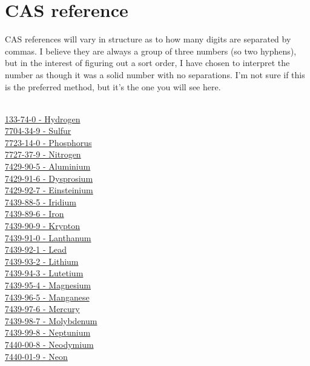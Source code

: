 \chapter{CAS reference}
CAS references will vary in structure as to how many digits are separated by commas.  I believe they are always a group of three numbers (so two hyphens), but in the interest of figuring out a sort order, I have chosen to interpret the number as though it was a solid number with no separations.  I'm not sure if this is the preferred method, but it's the one you will see here.\\
\\
\begin{multicols}{2}
\noindent
\hyperref[sec:elem-hydrogen]{133-74-0 - Hydrogen}\\
\hyperref[sec:elem-sulfur]{7704-34-9 - Sulfur}\\
\hyperref[sec:elem-phosphorus]{7723-14-0 - Phosphorus}\\
\hyperref[sec:elem-nitrogen]{7727-37-9 - Nitrogen}\\
\hyperref[sec:elem-aluminium]{7429-90-5 - Aluminium}\\
\hyperref[sec:elem-dysprosium]{7429-91-6 - Dysprosium}\\
\hyperref[sec:elem-einsteinium]{7429-92-7 - Einsteinium}\\
\hyperref[sec:elem-iridium]{7439-88-5 - Iridium}\\
\hyperref[sec:elem-iron]{7439-89-6 - Iron}\\
\hyperref[sec:elem-krypton]{7439-90-9 - Krypton}\\
\hyperref[sec:elem-lanthanum]{7439-91-0 - Lanthanum}\\
\hyperref[sec:elem-lead]{7439-92-1 - Lead}\\
\hyperref[sec:elem-lithium]{7439-93-2 - Lithium}\\
\hyperref[sec:elem-lutetium]{7439-94-3 - Lutetium}\\
\hyperref[sec:elem-magnesium]{7439-95-4 - Magnesium}\\
\hyperref[sec:elem-manganese]{7439-96-5 - Manganese}\\
\hyperref[sec:elem-mercury]{7439-97-6 - Mercury}\\
\hyperref[sec:elem-molybdenum]{7439-98-7 - Molybdenum}\\
\hyperref[sec:elem-neptunium]{7439-99-8 - Neptunium}\\
\hyperref[sec:elem-neodymium]{7440-00-8 - Neodymium}\\
\hyperref[sec:elem-neon]{7440-01-9 - Neon}\\

\end{multicols}
